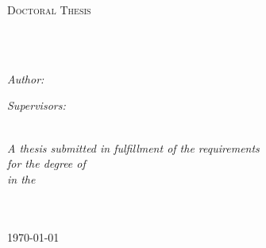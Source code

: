 \documentclass[
11pt, %
english, %
singlespacing, %
headsepline, %
]{MastersDoctoralThesis} %
\author{Viktor \textsc{Senderov}} %
\begin{document}
\frontmatter %

\pagestyle{plain} %


\begin{titlepage}
\begin{center}
\vspace*{.06\textheight}
{\scshape\LARGE \univname\par}\vspace{1.5cm} %
{\scshape\LARGE \compname\par}\vspace{1.5cm} %
\textsc{\Large Doctoral Thesis}\\[0.5cm] %

\HRule \\[0.4cm] %
{\huge \bfseries \ttitle\par}\vspace{0.4cm} %
\HRule \\[1.5cm] %
 
\begin{minipage}[t]{0.4\textwidth}
\begin{flushleft} \large
\emph{Author:}\\
\href{http://www.johnsmith.com}{\authorname} %
\end{flushleft}
\end{minipage}
\begin{minipage}[t]{0.4\textwidth}
\begin{flushright} \large
\emph{Supervisors:} \\
\href{http://www.jamessmith.com}{\supname} %
\end{flushright}
\end{minipage}\\[3cm]

\large \textit{A thesis submitted in fulfillment of the requirements\\ for the degree of \degreename}\\[0.3cm] %
\textit{in the}\\[0.4cm]
\groupname\\\deptname\\[2cm] %
 
\vfill

{\large \today}\\[4cm] %
 
\vfill
\end{center}
\end{titlepage}
\end{document}
